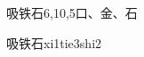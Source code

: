 \begin{entry}{吸铁石}{6,10,5}{⼝、⾦、⽯}
  \begin{phonetics}{吸铁石}{xi1tie3shi2}
  \end{phonetics}
\end{entry}
